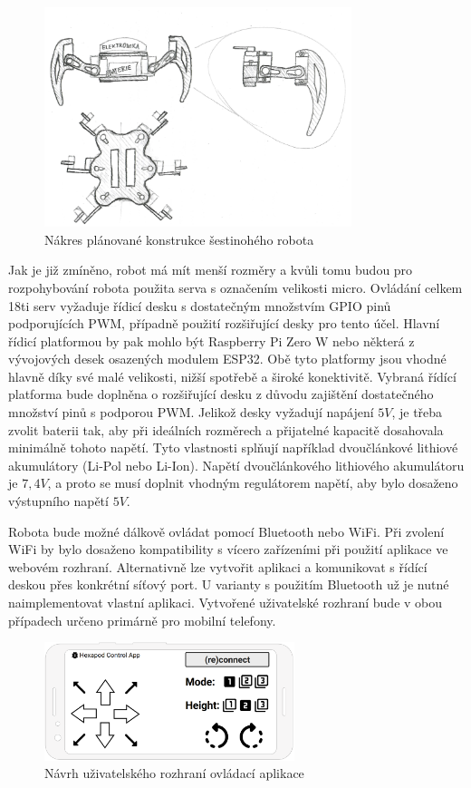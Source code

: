 \begin{figure}[hbt]
	\centering
	\includegraphics[width=0.8\textwidth]{obrazky-figures/design.jpg}
	\caption{Nákres plánované konstrukce šestinohého robota}
    \label{design}
\end{figure}

Jak je již zmíněno, robot má mít menší rozměry a kvůli tomu budou pro rozpohybování robota použita serva s označením velikosti micro. Ovládání celkem 18ti serv vyžaduje řídicí desku s dostatečným množstvím GPIO pinů podporujících PWM, případně použití rozšiřující desky pro tento účel. Hlavní řídicí platformou by pak mohlo být Raspberry Pi Zero W nebo některá z vývojových desek osazených modulem ESP32. Obě tyto platformy jsou vhodné hlavně díky své malé velikosti, nižší spotřebě a široké konektivitě. Vybraná řídící platforma bude doplněna o rozšiřující desku z důvodu zajištění dostatečného množství pinů s podporou PWM. Jelikož desky vyžadují napájení $5V$, je třeba zvolit baterii tak, aby při ideálních rozměrech a přijatelné kapacitě dosahovala minimálně tohoto napětí. Tyto vlastnosti splňují například dvoučlánkové lithiové akumulátory (Li-Pol nebo Li-Ion). Napětí dvoučlánkového lithiového akumulátoru je $7,4V$, a proto se musí doplnit vhodným regulátorem napětí, aby bylo dosaženo výstupního napětí $5V$.

Robota bude možné dálkově ovládat pomocí Bluetooth nebo WiFi. Při zvolení WiFi by bylo dosaženo kompatibility s vícero zařízeními při použití aplikace ve webovém rozhraní. Alternativně lze vytvořit aplikaci a komunikovat s řídící deskou přes konkrétní síťový port. U varianty s použitím Bluetooth už je nutné naimplementovat vlastní aplikaci. Vytvořené uživatelské rozhraní bude v obou případech určeno primárně pro mobilní telefony.

\begin{figure}[hbt]
	\centering
	\includegraphics[width=0.65\textwidth]{obrazky-figures/mockup.png}
	\caption{Návrh uživatelského rozhraní ovládací aplikace}
    \label{gui}
\end{figure}


